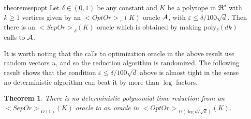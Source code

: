 \documentclass[11pt,letterpaper]{article}
\def\mathsf#1{<#1>}%
\def\xspace{}%
\newtheorem{theorem}{Theorem}[section]
\theoremstyle{definition}
\theoremstyle{remark}
\newcommand{\sht}{{\mathsf {SHT}}\xspace}
\newcommand{\sep}{{\mathsf{SepOr}}}
\newcommand{\opto}{{\mathsf{OptOr}}}
\begin{document}
\begin{restatable}{theorem}{sepopt}
\label{thm-sep-to-opt}
Let $\delta \in (0,1)$ be any constant and $K$ be  a polytope in $\Re^d$ with $k\geq 1$ vertices  given by an  $ \opto_\varepsilon(K)$ oracle $\cal A$, with $\varepsilon\leq \delta/100 \sqrt{d}$. Then there is an $\sep_\delta(K)$ oracle which is obtained by making  poly$_\delta (dk)$ calls to $\cal A$. 
\end{restatable}

It is worth noting that the  calls to optimization oracle in the above result use random vectors $u$, and so the reduction algorithm is randomized. The following result shows that the condition $\varepsilon\leq \delta/100 \sqrt{d}$ above is almost tight in the sense no deterministic algorithm can beat it by more than $\log$ factors. 

\begin{theorem}\label{thm-sep-opt-lower}
There is no deterministic polynomial time reduction from an  $\sep_{O(1)}(K)$ oracle to an oracle in $\opto_{\Omega(\log d/\sqrt{d})}(K).$ 
\end{theorem}



\end{document}
